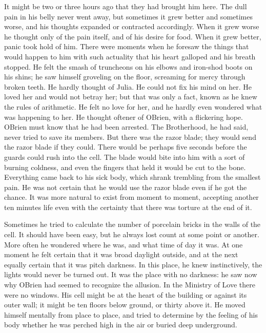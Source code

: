 It might be two or three hours ago that they had brought him here. The
dull pain in his belly never went away, but sometimes it grew better and
sometimes worse, and his thoughts expanded or contracted accordingly.
When it grew worse he thought only of the pain itself, and of his desire
for food. When it grew better, panic took hold of him. There were
moments when he foresaw the things that would happen to him with such
actuality that his heart galloped and his breath stopped. He felt the
smash of truncheons on his elbows and iron-shod boots on his shins; he
saw himself groveling on the floor, screaming for mercy through broken
teeth. He hardly thought of Julia. He could not fix his mind on her. He
loved her and would not betray her; but that was only a fact, known as
he knew the rules of arithmetic. He felt no love for her, and he hardly
even wondered what was happening to her. He thought oftener of
O\textquotesingle Brien, with a flickering hope. O\textquotesingle Brien
must know that he had been arrested. The Brotherhood, he had said, never
tried to save its members. But there was the razor blade; they would
send the razor blade if they could. There would be perhaps five seconds
before the guards could rush into the cell. The blade would bite into
him with a sort of burning coldness, and even the fingers that held it
would be cut to the bone. Everything came back to his sick body, which
shrank trembling from the smallest pain. He was not certain that he
would use the razor blade even if he got the chance. It was more natural
to exist from moment to moment, accepting another ten
minutes\textquotesingle{} life even with the certainty that there was
torture at the end of it.

Sometimes he tried to calculate the number of porcelain bricks in the
walls of the cell. It should have been easy, but he always lost count at
some point or another. More often he wondered where he was, and what
time of day it was. At one moment he felt certain that it was broad
daylight outside, and at the next equally certain that it was pitch
darkness. In this place, he knew instinctively, the lights would never
be turned out. It was the place with no darkness: he saw now why
O\textquotesingle Brien had seemed to recognize the allusion. In the
Ministry of Love there were no windows. His cell might be at the heart
of the building or against its outer wall; it might be ten floors below
ground, or thirty above it. He moved himself mentally from place to
place, and tried to determine by the feeling of his body whether he was
perched high in the air or buried deep underground.

